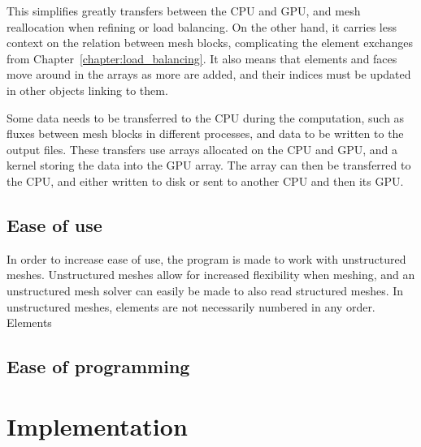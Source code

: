 This simplifies greatly transfers between the CPU and GPU, and mesh reallocation when refining or
load balancing. On the other hand, it carries less context on the relation between mesh blocks,
complicating the element exchanges from Chapter~\ref{chapter:load_balancing}. It also means that
elements and faces move around in the arrays as more are added, and their indices must be updated in
other objects linking to them. 

Some data needs to be transferred to the CPU during the computation, such as fluxes between mesh
blocks in different processes, and data to be written to the output files. These transfers use
arrays allocated on the CPU and GPU, and a kernel storing the data into the GPU array. The array can
then be transferred to the CPU, and either written to disk or sent to another CPU and then its GPU.

\subsection{Ease of use} \label{section:graphics_processing_units:data_structure:ease_of_use}


In order to increase ease of use, the program is made to work with unstructured meshes. Unstructured
meshes allow for increased flexibility when meshing, and an unstructured mesh solver can easily be
made to also read structured meshes. In unstructured meshes, elements are not necessarily numbered
in any order. Elements 

\subsection{Ease of programming} \label{section:graphics_processing_units:data_structure:ease_of_programming}

\section{Implementation} \label{section:graphics_processing_units:implementation}
